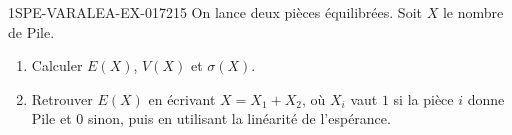 \begin{exercice}{1SPE-VARALEA-EX-017}{2}{15}
On lance deux pièces équilibrées. Soit $X$ le nombre de Pile.

\begin{enumerate}
  \item Calculer $E(X)$, $V(X)$ et $\sigma(X)$.
  \item Retrouver $E(X)$ en écrivant $X=X_1+X_2$, où $X_i$ vaut $1$ si
  la pièce $i$ donne Pile et $0$ sinon, puis en utilisant la linéarité de
  l'espérance.
\end{enumerate}
\end{exercice}
